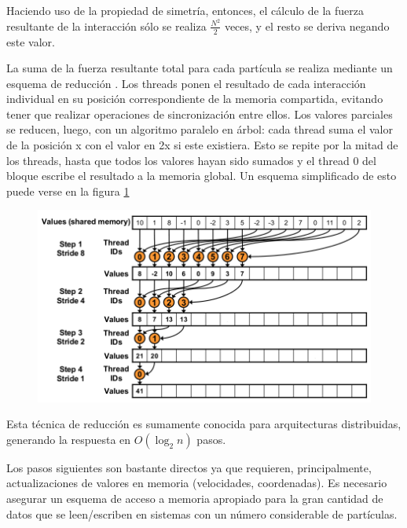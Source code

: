 Haciendo uso de la propiedad de simetría, entonces, el cálculo de la fuerza resultante de la interacción sólo se realiza $\frac{N^2}{2}$ veces, y el resto se deriva negando este valor.


La suma de la fuerza resultante total para cada partícula se realiza mediante un esquema de reducción \cite{cudaReductions}. 
Los threads ponen el resultado de cada interacción individual en su posición correspondiente de la memoria compartida, evitando tener que realizar operaciones de sincronización entre ellos. 
Los valores parciales se reducen, luego, con un algoritmo paralelo en árbol: cada thread suma el valor de la posición x con el valor en 2x si este existiera. 
Esto se repite por la mitad de los threads, hasta que todos los valores hayan sido sumados y el thread 0 del bloque escribe el resultado a la memoria global.
Un esquema simplificado de esto puede verse en la figura \ref{reduction}
\begin{figure}[htbp]
   \centering
   \includegraphics[width=\plotwidth]{img/md/reductions.png}
   \caption{}
   \label{reduction}
\end{figure}

Esta técnica de reducción es sumamente conocida para arquitecturas distribuidas, generando la respuesta en $O(\log_2{n})$ pasos.

Los pasos siguientes son bastante directos ya que requieren, principalmente, actualizaciones de valores en memoria (velocidades, coordenadas). 
Es necesario asegurar un esquema de acceso a memoria apropiado para la gran cantidad de datos que se leen/escriben en sistemas con un número considerable de partículas.  

